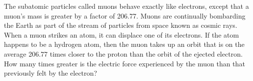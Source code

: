 The subatomic particles called muons behave exactly like
        electrons, except that a muon's mass is greater by a factor
        of 206.77.  Muons are continually bombarding the Earth as
        part of the stream of particles from space known as cosmic
        rays.  When a muon strikes an atom, it can displace one of
        its electrons.  If the atom happens to be a hydrogen atom,
        then the muon takes up an orbit that is on the average
        206.77 times closer to the proton than the orbit of the
        ejected electron.  How many times greater is the electric
        force experienced by the muon than that previously
        felt by the electron?\answercheck
